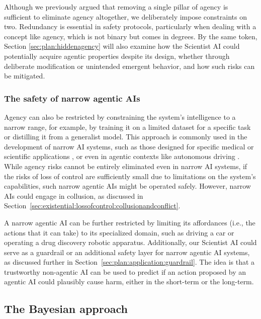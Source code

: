 Although we previously argued that removing a single pillar of agency is sufficient to eliminate agency altogether, we deliberately impose constraints on two. Redundancy is essential in safety protocols, particularly when dealing with a concept like agency, which is not binary but comes in degrees. By the same token, Section \ref{sec:plan:hiddenagency} will also examine how the Scientist AI could potentially acquire agentic properties despite its design, whether through deliberate modification or unintended emergent behavior, and how such risks can be mitigated.



    \subsubsection{The safety of narrow agentic AIs}
    \label{sec:plan:restricting:safetynarrow}
    
Agency can also be restricted by constraining the system's intelligence to a narrow range, for example, by training it on a limited dataset for a specific task or distilling it from a generalist model. This approach is commonly used in the development of narrow AI systems, such as those designed for specific medical or scientific applications \cite{www.nature.com.articles.s41586.019.1799.6}, or even in agentic contexts like autonomous driving \cite{arxiv.org.abs.1604.07316}. While agency risks cannot be entirely eliminated even in narrow AI systems, if the risks of loss of control are sufficiently small due to limitations on the system’s capabilities, such narrow agentic AIs might be operated safely. However, narrow AIs could engage in collusion, as discussed in Section~\ref{sec:existential:lossofcontrol:collusionandconflict}.

A narrow agentic AI can be further restricted by limiting its affordances (i.e., the actions that it can take) to its specialized domain, such as driving a car or operating a drug discovery robotic apparatus. Additionally, our Scientist AI could serve as a guardrail or an additional safety layer for narrow agentic AI systems, as discussed further in Section~\ref{sec:plan:application:guardrail}. The idea is that a trustworthy non-agentic AI can be used to predict if an action proposed by an agentic AI could plausibly cause harm, either in the short-term or the long-term.

\subsection{The Bayesian approach}
\label{sec:plan:bayesian}
    
